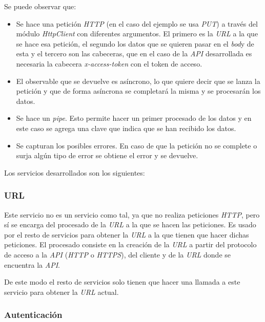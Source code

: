 \bigskip
Se puede observar que:
\begin{itemize}
	\item Se hace una petición \textit{HTTP} (en el caso del ejemplo se usa \textit{PUT}) a través del módulo \textit{HttpClient} con diferentes argumentos. El primero es la \textit{URL} a la que se hace esa petición, el segundo los datos que se quieren pasar en el \textit{bod}y de esta y el tercero son las cabeceras, que en el caso de la \textit{API} desarrollada es necesaria la cabecera \textit{x-access-token} con el token de acceso.
	\item El observable que se devuelve es asíncrono, lo que quiere decir que se lanza la petición y que de forma asíncrona se completará la misma y se procesarán los datos.
	\item Se hace un \textit{pipe}. Esto permite hacer un primer procesado de los datos y en este caso se agrega una clave que indica que se han recibido los datos.
	\item Se capturan los posibles errores. En caso de que la petición no se complete o surja algún tipo de error se obtiene el error y se devuelve.
\end{itemize}


\bigskip
Los servicios desarrollados son los siguientes:

\subsubsection{URL}

Este servicio no es un servicio como tal, ya que no realiza peticiones \textit{HTTP}, pero sí se encarga del procesado  de la \textit{URL} a la que se hacen las peticiones. Es usado por el resto de servicios para obtener la \textit{URL} a la que tienen que hacer dichas peticiones. El procesado consiste en la creación de la \textit{URL} a partir del protocolo de acceso a la \textit{API} (\textit{HTTP} o \textit{HTTPS}), del cliente y de la \textit{URL} donde se encuentra la \textit{API}.

De este modo el resto de servicios solo tienen que hacer una llamada a este servicio para obtener la \textit{URL} actual.


\subsubsection{Autenticación}

